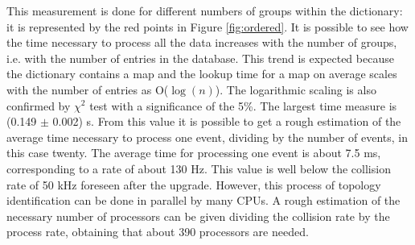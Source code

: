 %
This measurement is done for different numbers of groups within the dictionary: it is represented by the red points in Figure \ref{fig:ordered}. It is possible to see how the time necessary to process all the data increases with the number of groups, i.e. with the number of entries in the database. This trend is expected because the dictionary contains a map and the lookup time for a map on average scales with the number of entries as O($\log(n)$). The logarithmic scaling is also confirmed by $\chi^2$ test with a significance of the 5\%. The largest time measure is (0.149 $\pm$ 0.002) s. From this value it is possible to get a rough estimation of the average time necessary to process one event, dividing by the number of events, in this case twenty. The average time for processing one event is about 7.5 ms, corresponding to a rate of about 130 Hz. This value is well below the collision rate of 50 kHz foreseen after the upgrade. However, this process of topology identification can be done in parallel by many CPUs. A rough estimation of the necessary number of processors can be given dividing the collision rate by the process rate, obtaining that about 390 processors are needed. %
